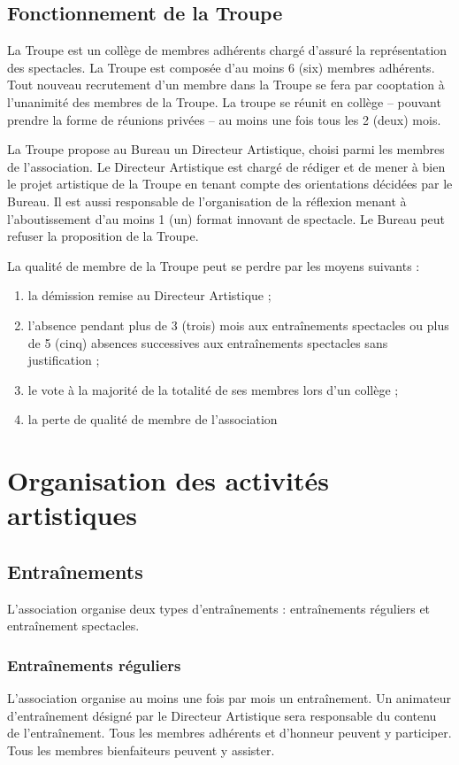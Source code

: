 \documentclass[a4paper,french,10pt]{article}
\begin{document}
\subsection{Fonctionnement de la Troupe}
\label{sec:fonctionnement-troupe}
La Troupe est un collège de membres adhérents chargé d'assuré la représentation des spectacles. La Troupe est composée d'au moins 6 (six) membres adhérents. Tout nouveau recrutement d'un membre dans la Troupe se fera par cooptation à l'unanimité des membres de la Troupe. La troupe se réunit en collège -- pouvant prendre la forme de réunions privées -- au moins une fois tous les 2 (deux) mois.

La Troupe propose au Bureau un Directeur Artistique, choisi parmi les membres de l'association. Le Directeur Artistique est chargé de rédiger et de mener à bien le projet artistique de la Troupe en tenant compte des orientations décidées par le Bureau. Il est aussi responsable de l'organisation de la réflexion menant à l'aboutissement d'au moins 1 (un) format innovant de spectacle. Le Bureau peut refuser la proposition de la Troupe. 

La qualité de membre de la Troupe peut se perdre par les moyens suivants :

\begin{enumerate}
	\item la démission remise au Directeur Artistique ;
	\item l'absence pendant plus de 3 (trois) mois aux entraînements spectacles ou plus de 5 (cinq) absences successives aux entraînements spectacles sans justification ;
	\item le vote à la majorité de la totalité de ses membres lors d'un collège ;
	\item la perte de qualité de membre de l'association
\end{enumerate}



\section{Organisation des activités artistiques}
\subsection{Entraînements}
L'association organise deux types d'entraînements : entraînements réguliers et entraînement spectacles.

\subsubsection{Entraînements réguliers}
L'association organise au moins une fois par mois un entraînement. Un animateur d'entraînement désigné par le Directeur Artistique sera responsable du contenu de l'entraînement. Tous les membres adhérents et d'honneur peuvent y participer. Tous les membres bienfaiteurs peuvent y assister.
\end{document}
